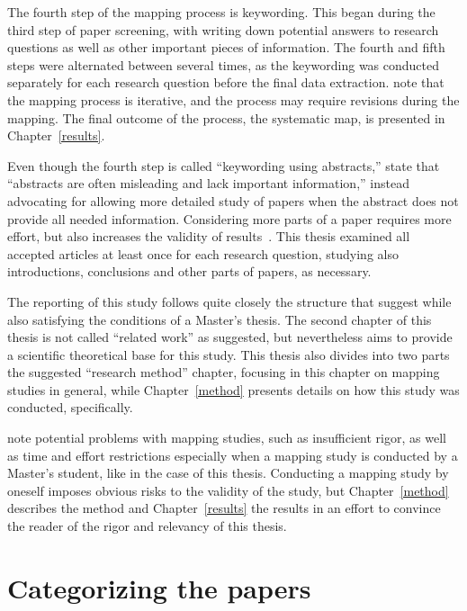 \documentclass[utf8,english]{gradu3}
\begin{document}
The fourth step of the mapping process is keywording. This began during the third step of paper screening,
with writing down potential answers to research questions as well as other important pieces of information.
The fourth and fifth steps were alternated between several times, as the keywording was conducted separately
for each research question before the final data extraction.
\textcite{petersen2015guidelines} note that the mapping process is iterative,
and the process may require revisions during the mapping.
The final outcome of the process, the systematic map, is presented in Chapter~\ref{results}.

Even though the fourth step is called ``keywording using abstracts,'' \textcite{petersen2008} state that
\enquote{abstracts are often misleading and lack important information,} instead advocating for
allowing more detailed study of papers when the abstract does not provide all needed information.
Considering more parts of a paper requires more effort, but also increases the validity of results~\parencite[p. 9]{petersen2008}.
This thesis examined all accepted articles at least once for each research question,
studying also introductions, conclusions and other parts of papers, as necessary.

The reporting of this study follows quite closely the structure that \textcite{petersen2015guidelines} suggest
while also satisfying the conditions of a Master's thesis. The second chapter of this thesis is not called ``related work''
as suggested, but nevertheless aims to provide a scientific theoretical base for this study.
This thesis also divides into two parts the suggested ``research method'' chapter,
focusing in this chapter on mapping studies in general,
while Chapter~\ref{method} presents details on how this study was conducted, specifically.

\textcite{kitchenham2011} note potential problems with mapping studies, such as insufficient rigor, as well as
time and effort restrictions especially when a mapping study is conducted by a Master's student, like in the case of this thesis.
Conducting a mapping study by oneself imposes obvious risks to the validity of the study, but
Chapter~\ref{method} describes the method and Chapter~\ref{results} the results in an effort to convince
the reader of the rigor and relevancy of this thesis.

\section{Categorizing the papers} \label{classified}
\end{document}

